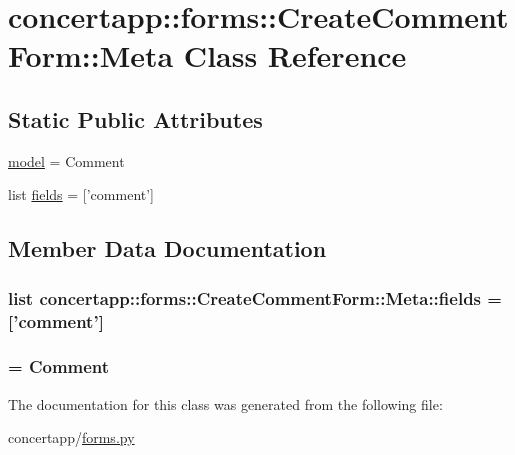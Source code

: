 \hypertarget{classconcertapp_1_1forms_1_1_create_comment_form_1_1_meta}{
\section{concertapp::forms::CreateCommentForm::Meta Class Reference}
\label{classconcertapp_1_1forms_1_1_create_comment_form_1_1_meta}
}
\subsection*{Static Public Attributes}
\begin{DoxyCompactItemize}
\item 
\hyperlink{classconcertapp_1_1forms_1_1_create_comment_form_1_1_meta_a2b51c5a02bad54dfc52587d33669c5f3}{model} = Comment
\item 
list \hyperlink{classconcertapp_1_1forms_1_1_create_comment_form_1_1_meta_a2d7ac786e7d15c0aa8cb71db653e921f}{fields} = \mbox{[}'comment'\mbox{]}
\end{DoxyCompactItemize}


\subsection{Member Data Documentation}
\hypertarget{classconcertapp_1_1forms_1_1_create_comment_form_1_1_meta_a2d7ac786e7d15c0aa8cb71db653e921f}{
\subsubsection[{fields}]{\setlength{\rightskip}{0pt plus 5cm}list {\bf concertapp::forms::CreateCommentForm::Meta::fields} = \mbox{[}'comment'\mbox{]}}}
\label{classconcertapp_1_1forms_1_1_create_comment_form_1_1_meta_a2d7ac786e7d15c0aa8cb71db653e921f}
\hypertarget{classconcertapp_1_1forms_1_1_create_comment_form_1_1_meta_a2b51c5a02bad54dfc52587d33669c5f3}{
\subsubsection[{model}]{ = Comment}}
\label{classconcertapp_1_1forms_1_1_create_comment_form_1_1_meta_a2b51c5a02bad54dfc52587d33669c5f3}


The documentation for this class was generated from the following file:\begin{DoxyCompactItemize}
\item 
concertapp/\hyperlink{forms_8py}{forms.py}\end{DoxyCompactItemize}
